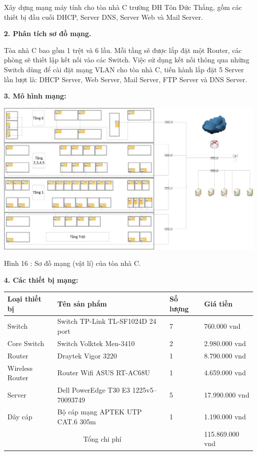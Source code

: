 \documentclass{report}
\begin{document}
\bigskip
Xây dựng mạng máy tính cho tòa nhà C trường ĐH Tôn Đức Thắng, gồm các thiết bị đầu cuối DHCP, Server DNS, Server Web và Mail Server.

\bigskip
\changefontsizes{14pt}
\textbf{2.	Phân tích sơ đồ mạng.}
\changefontsizes{13pt}

\bigskip
Tòa nhà C bao gồm 1 trệt và 6 lầu. Mỗi tầng sẽ được lắp đặt một Router, các phòng sẽ thiết lập kết nối vào các Switch. Việc sử dụng kết nối thông qua những Switch dùng để cài đặt mạng VLAN cho tòa nhà C, tiến hành lắp đặt 5 Server lần lượt là: DHCP Server, Web Server, Mail Server, FTP Server và DNS Server. 

\bigskip
\changefontsizes{14pt}
\textbf{3.	Mô hình mạng:}
\changefontsizes{13pt}
\bigskip

\begin{center}
     \includegraphics[scale=0.0825]{logic}
\end{center}
\centerline{Hình 16 : Sơ đồ mạng (vật lí) của tòa nhà C.}
\bigskip

\changefontsizes{14pt}
\textbf{4.	Các thiết bị mạng:}
\changefontsizes{12pt}
\smallskip

\begin{tabular}{|m{1.8cm}|m{7.6cm}|m{1cm}|m{3.2cm}|}
    \hline
    Loại thiết bị & Tên sản phẩm & Số lượng & Giá tiền\\
	\hline
	Switch & Switch TP-Link TL-SF1024D 24 port & 7 & 760.000 vnd\\
	\hline	
	Core Switch & Switch Volktek Men-3410 & 2 & 2.980.000 vnd\\
	\hline
	Router & Draytek Vigor 3220 & 1 & 8.790.000 vnd\\
	\hline
	Wireless Router & Router Wifi ASUS RT-AC68U & 1 & 4.659.000 vnd\\
	\hline
	Server & Dell PowerEdge T30 E3 1225v5–70093749 & 5 & 17.990.000 vnd\\
	\hline
	Dây cáp & Bộ cáp mạng APTEK UTP CAT.6 305m & 1 & 1.190.000 vnd\\
	\hline
	\multicolumn{3}{|c|}{Tổng chi phí} & 115.869.000 vnd\\
	\hline
\end{tabular}
\end{document}
